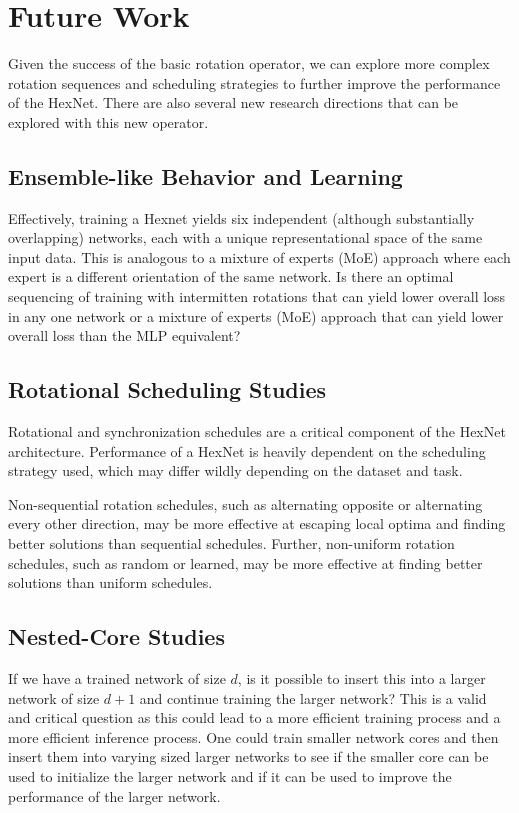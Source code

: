 \section{Future Work}

Given the success of the basic rotation operator, we can explore more complex rotation sequences and scheduling strategies to further improve the performance of the HexNet.
There are also several new research directions that can be explored with this new operator.

\subsection{Ensemble-like Behavior and Learning}
Effectively, training a Hexnet yields six independent (although substantially overlapping) networks, each with a unique representational space of the same input data.
This is analogous to a mixture of experts (MoE) approach where each expert is a different orientation of the same network.
Is there an optimal sequencing of training with intermitten rotations that can yield lower overall loss in any one network or a mixture of experts (MoE) approach that can yield lower overall loss than the MLP equivalent?

\subsection{Rotational Scheduling Studies}

Rotational and synchronization schedules are a critical component of the HexNet architecture.
Performance of a HexNet is heavily dependent on the scheduling strategy used, which may differ wildly depending on the dataset and task.

Non-sequential rotation schedules, such as alternating opposite or alternating every other direction, may be more effective at escaping local optima and finding better solutions than sequential schedules.
Further, non-uniform rotation schedules, such as random or learned, may be more effective at finding better solutions than uniform schedules.


\subsection{Nested-Core Studies}

If we have a trained network of size $d$, is it possible to insert this into a larger network of size $d+1$ and continue training the larger network?
This is a valid and critical question as this could lead to a more efficient training process and a more efficient inference process.
One could train smaller network cores and then insert them into varying sized larger networks to see if the smaller core can be used to initialize the larger network and if it can be used to improve the performance of the larger network.

